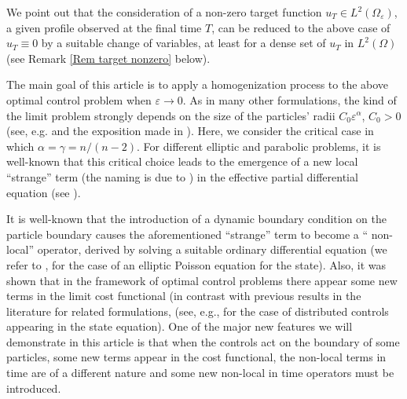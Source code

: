 \documentclass[reqno]{amsart}
\begin{document}
We point out that the consideration of a non-zero target function
$u_{T}\in L^2(\Omega _{\varepsilon })$, a given profile observed at the final time
$T $, can be reduced to the above case of $u_{T}\equiv 0$ by a suitable
change of variables, at least for a dense set of $u_{T}$ in $L^2(\Omega )$
(see Remark \ref{Rem target nonzero} below).

The main goal of this article is to apply a homogenization process to the
above optimal control problem when $\varepsilon \to 0$. As in many
other formulations, the kind of the limit problem strongly depends on the
size of the particles' radii $C_0\varepsilon ^{\alpha }$, $C_0>0$
(see, e.g. \cite{ Anguiano,Timof} and the exposition made in
\cite{DiGoShBook}). Here, we consider the critical case in which
$\alpha =\gamma ={n}/{(n-2)}$. For different elliptic and parabolic problems,
it is well-known that this critical choice leads to the emergence of a new local
``strange''  term (the naming is due to \cite{Cioranescu1997AST}) in the effective
partial differential equation
(see \cite{ Cioranescu1997AST, DiGoShBook,  Hurlov, Kaizu1,ZuShDiffEq}).

It is well-known that the introduction of a dynamic boundary condition on
the particle boundary causes the aforementioned ``strange''  term  to become a ``
non-local''  operator, derived by solving a suitable
ordinary differential equation (we refer to
\cite{ShDyn19, DiShZarbitrary}, for the case of an elliptic Poisson equation
for the state).
Also, it was shown that in the framework of optimal control problems
there appear some new terms in the limit cost functional (in contrast with
previous results in the literature for related formulations, (see, e.g.,
\cite{DShPo-first control,  DiPoSh control arbt size, DiPoShBound22,
DiPoShAttouch,  PoShControl20, SJPZ02, ZuShDynDok19,  Shaposhnikova2022HomogenizationOT}
for the case of distributed controls appearing in the state equation).
One of the major new features we will demonstrate in this article
is that when the controls act on the boundary of some particles, some new
terms appear in the cost functional, the non-local terms in time are of a
different nature and some new non-local in time operators must be introduced.
\end{document}
